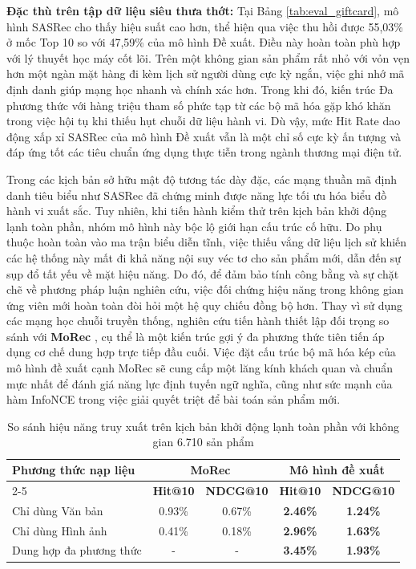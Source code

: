 \textbf{Đặc thù trên tập dữ liệu siêu thưa thớt:} Tại Bảng \ref{tab:eval_giftcard}, mô hình SASRec cho thấy hiệu suất cao hơn, thể hiện qua việc thu hồi được 55,03\% ở mốc Top 10 so với 47,59\% của mô hình Đề xuất. Điều này hoàn toàn phù hợp với lý thuyết học máy cốt lõi. Trên một không gian sản phẩm rất nhỏ với vỏn vẹn hơn một ngàn mặt hàng đi kèm lịch sử người dùng cực kỳ ngắn, việc ghi nhớ mã định danh giúp mạng học nhanh và chính xác hơn. Trong khi đó, kiến trúc Đa phương thức với hàng triệu tham số phức tạp từ các bộ mã hóa gặp khó khăn trong việc hội tụ khi thiếu hụt chuỗi dữ liệu hành vi. Dù vậy, mức Hit Rate dao động xấp xỉ SASRec của mô hình Đề xuất vẫn là một chỉ số cực kỳ ấn tượng và đáp ứng tốt các tiêu chuẩn ứng dụng thực tiễn trong ngành thương mại điện tử.

\vspace{0.5cm}

\noindent Trong các kịch bản sở hữu mật độ tương tác dày đặc, các mạng thuần mã định danh tiêu biểu như SASRec đã chứng minh được năng lực tối ưu hóa biểu đồ hành vi xuất sắc. Tuy nhiên, khi tiến hành kiểm thử trên kịch bản khởi động lạnh toàn phần, nhóm mô hình này bộc lộ giới hạn cấu trúc cố hữu. Do phụ thuộc hoàn toàn vào ma trận biểu diễn tĩnh, việc thiếu vắng dữ liệu lịch sử khiến các hệ thống này mất đi khả năng nội suy véc tơ cho sản phẩm mới, dẫn đến sự sụp đổ tất yếu về mặt hiệu năng. Do đó, để đảm bảo tính công bằng và sự chặt chẽ về phương pháp luận nghiên cứu, việc đối chứng hiệu năng trong không gian ứng viên mới hoàn toàn đòi hỏi một hệ quy chiếu đồng bộ hơn. Thay vì sử dụng các mạng học chuỗi truyền thống, nghiên cứu tiến hành thiết lập đối trọng so sánh với \textbf{MoRec} \cite{55}, cụ thể là một kiến trúc gợi ý đa phương thức tiên tiến áp dụng cơ chế dung hợp trực tiếp đầu cuối. Việc đặt cấu trúc bộ mã hóa kép của mô hình đề xuất cạnh MoRec sẽ cung cấp một lăng kính khách quan và chuẩn mực nhất để đánh giá năng lực định tuyến ngữ nghĩa, cũng như sức mạnh của hàm InfoNCE trong việc giải quyết triệt để bài toán sản phẩm mới.

\begin{table}[H]
    \centering
    \caption{So sánh hiệu năng truy xuất trên kịch bản khởi động lạnh toàn phần với không gian 6.710 sản phẩm}
    \label{tab:morec_vs_proposed}
    \renewcommand{\arraystretch}{1.3}
    \begin{tabular}{lcccc}
        \hline
        \textbf{Phương thức nạp liệu} & \multicolumn{2}{c}{\textbf{MoRec}} & \multicolumn{2}{c}{\textbf{Mô hình đề xuất}} \\
        \cline{2-5}
        & \textbf{Hit@10} & \textbf{NDCG@10} & \textbf{Hit@10} & \textbf{NDCG@10} \\
        \hline
        Chỉ dùng Văn bản & 0.93\% & 0.67\% & \textbf{2.46\%} & \textbf{1.24\%} \\
        Chỉ dùng Hình ảnh & 0.41\% & 0.18\% & \textbf{2.96\%} & \textbf{1.63\%} \\
        Dung hợp đa phương thức & - & - & \textbf{3.45\%} & \textbf{1.93\%} \\
        \hline
    \end{tabular}
\end{table}

